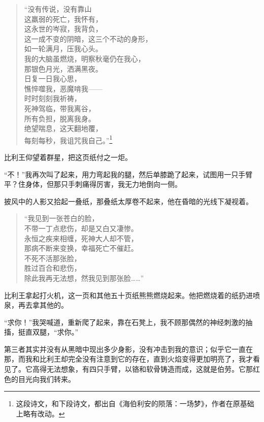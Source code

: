 \documentclass[AutoFakeBold=true]{book}
\begin{document}
\begin{quote}
	{\kaishu ``没有传说，没有靠山\\
	这羸弱的死亡，我怀有，\\
	这永世的岑寂，我背负，\\
	这一成不变的阴暗，这三个不动的身形，\\
	如一轮满月，压我心头。\\
	我的大脑虽燃烧，明察秋毫仍在我心，\\
	那银色月光，洒满黑夜。\\
	日复一日我心思，\\
	憔悴噬我，恶魔啃我——\\
	时时刻刻我祈祷，\\
	死神驾临，带我离谷，\\
	所有负担，脱离我身。\\
	绝望喘息，这天翻地覆，\\
	每刻每秒，我诅咒我自己。''}\footnote{这段诗文，和下段诗文，都出自《海伯利安的陨落：一场梦》，作者在原基础上略有改动。}
\end{quote}

比利王仰望着群星，把这页纸付之一炬。

``不！''我再次叫了起来，用力弯起我的腿，然后单膝跪了起来，试图用一只手臂平？住身体，但那只手刺痛得厉害，我无力地倒向一侧。

披风中的人影又拾起一叠纸，那叠纸太厚卷不起来，他在昏暗的光线下凝视着。

\begin{quote}
	{\kaishu ``我见到一张苍白的脸，\\
	不带一丁点悲伤，却是又白又凄惨。\\
	永恒之疾来相缠，死神大人却不管，\\
	那病不断来变换，幸福死亡不催赶。\\
	不死不活那张脸，\\
	胜过百合和悲伤，\\
	除此我再无法想，然我见到那张脸……''}
\end{quote}

比利王拿起打火机，这一页和其他五十页纸熊熊燃烧起来。他把燃烧着的纸扔进喷泉，再去拿其他的。

``求你！''我哭喊道，重新爬了起来，靠在石凳上，我不顾那偶然的神经刺激的抽搐，挺直双腿，``求你。''

第三者其实并没有从黑暗中现出多少身影，没有冲击到我的意识；似乎它一直在那，而我和比利王却完全没有注意到它的存在，直到火焰变得更加明亮了，我才看见了。它高得无法想象，有四只手臂，以铬和软骨铸造而成，这就是伯劳。它那红色的目光向我们转来。
\end{document}

